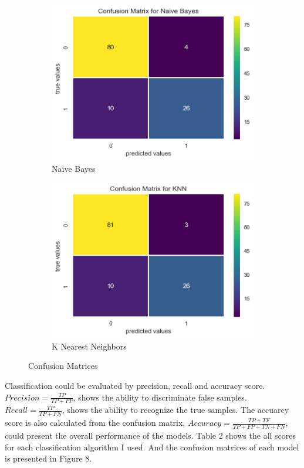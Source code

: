 \documentclass[12pt]{article}
\begin{document}
\begin{sloppypar}
\begin{figure}[H]
\begin{subfigure}[b]{0.48\textwidth}
    \includegraphics[width=\textwidth]{CM_Naive_Bayes.png}
    \caption{Naive Bayes}
  \end{subfigure}
  \begin{subfigure}[b]{0.48\textwidth}
    \includegraphics[width=\textwidth]{CM_KNN.png}
    \caption{K Nearest Neighbors}
  \end{subfigure}
   \caption{Confusion Matrices}
\end{figure}

Classification could be evaluated by precision, recall and accuracy score. $Precision = \frac{TP}{TP+FP}$, shows the ability to discriminate false samples.  $Recall = \frac{TP}{TP+FN}$, shows the ability to recognize the true samples. The accuarcy score is also calculated from the confusion matrix, $Accuracy = \frac{TP+TF}{TP+FP+TN+FN}$, could present the overall performance of the models. Table 2 shows the all scores for each classification algorithm I used. And the confusion matrices of each model is presented in Figure 8.


\end{sloppypar}
\end{document}
